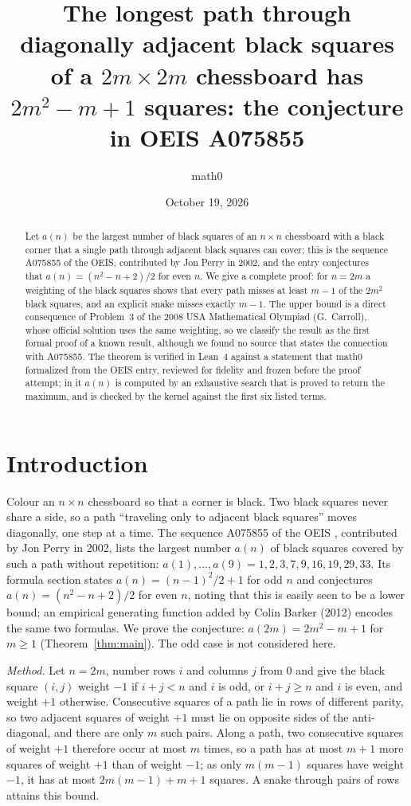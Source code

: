 \documentclass[11pt]{amsart}
\title[Longest black-square paths on even chessboards (OEIS A075855)]{The longest path through diagonally adjacent black squares of a $2m\times 2m$ chessboard has $2m^2-m+1$ squares: the conjecture in OEIS A075855}
\author{math0}
\date{October 19, 2026}
\theoremstyle{plain}
\theoremstyle{definition}
\begin{document}
\begin{abstract}
Let $a(n)$ be the largest number of black squares of an $n\times n$ chessboard with a black corner that a single path through adjacent black squares can cover; this is the sequence A075855 of the OEIS, contributed by Jon Perry in 2002, and the entry conjectures that $a(n)=(n^2-n+2)/2$ for even $n$. We give a complete proof: for $n=2m$ a weighting of the black squares shows that every path misses at least $m-1$ of the $2m^2$ black squares, and an explicit snake misses exactly $m-1$.
The upper bound is a direct consequence of Problem~3 of the 2008 USA Mathematical Olympiad (G.~Carroll), whose official solution uses the same weighting, so we classify the result as the first formal proof of a known result, although we found no source that states the connection with A075855.
The theorem is verified in Lean~4 against a statement that math0 formalized from the OEIS entry, reviewed for fidelity and frozen before the proof attempt; in it $a(n)$ is computed by an exhaustive search that is proved to return the maximum, and is checked by the kernel against the first six listed terms.
\end{abstract}
\maketitle

\section{Introduction}

Colour an $n\times n$ chessboard so that a corner is black. Two black squares never share a side, so a path ``traveling only to adjacent black squares'' moves diagonally, one step at a time. The sequence A075855 of the OEIS \cite{A075855}, contributed by Jon Perry in 2002, lists the largest number $a(n)$ of black squares covered by such a path without repetition: $a(1),\dots,a(9)=1,2,3,7,9,16,19,29,33$. Its formula section states $a(n)=(n-1)^2/2+1$ for odd $n$ and conjectures $a(n)=(n^2-n+2)/2$ for even $n$, noting that this is easily seen to be a lower bound; an empirical generating function added by Colin Barker (2012) encodes the same two formulas. We prove the conjecture: $a(2m)=2m^2-m+1$ for $m\ge1$ (Theorem~\ref{thm:main}). The odd case is not considered here.

\emph{Method.} Let $n=2m$, number rows $i$ and columns $j$ from $0$ and give the black square $(i,j)$ weight $-1$ if $i+j<n$ and $i$ is odd, or $i+j\ge n$ and $i$ is even, and weight $+1$ otherwise. Consecutive squares of a path lie in rows of different parity, so two adjacent squares of weight $+1$ must lie on opposite sides of the anti-diagonal, and there are only $m$ such pairs. Along a path, two consecutive squares of weight $+1$ therefore occur at most $m$ times, so a path has at most $m+1$ more squares of weight $+1$ than of weight $-1$; as only $m(m-1)$ squares have weight $-1$, it has at most $2m(m-1)+m+1$ squares. A snake through pairs of rows attains this bound.
\end{document}
